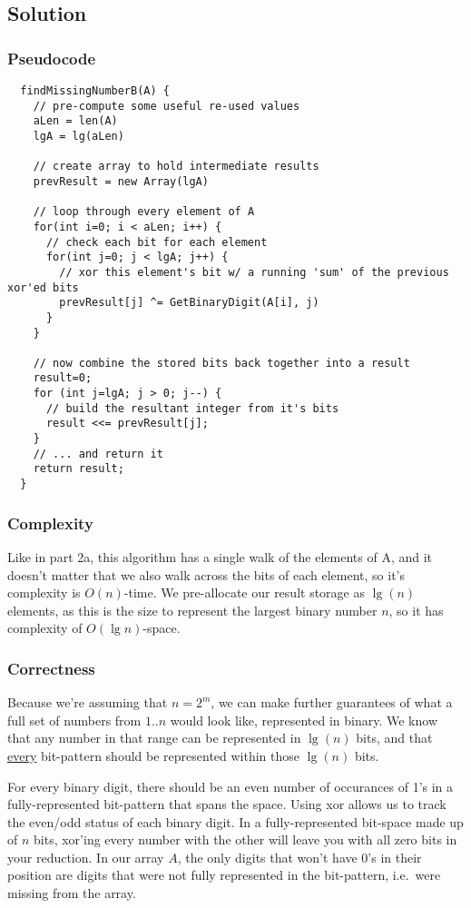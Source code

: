 \subsection*{Solution}
\subsubsection*{Pseudocode}
\begin{verbatim}
  findMissingNumberB(A) {
    // pre-compute some useful re-used values
    aLen = len(A)
    lgA = lg(aLen)

    // create array to hold intermediate results
    prevResult = new Array(lgA)

    // loop through every element of A
    for(int i=0; i < aLen; i++) {
      // check each bit for each element
      for(int j=0; j < lgA; j++) {
        // xor this element's bit w/ a running 'sum' of the previous xor'ed bits
        prevResult[j] ^= GetBinaryDigit(A[i], j)
      }
    }

    // now combine the stored bits back together into a result
    result=0;
    for (int j=lgA; j > 0; j--) {
      // build the resultant integer from it's bits
      result <<= prevResult[j];
    }
    // ... and return it
    return result;
  }
\end{verbatim}

\subsubsection*{Complexity}
Like in part 2a, this algorithm has a single walk of the elements of A, and it doesn't matter that we also walk across the bits of each element, so it's complexity is $O(n)$-time. We pre-allocate our result storage as $\lg(n) $elements, as this is the size to represent the largest binary number $n$, so it has complexity of $O(\lg n)$-space.

\subsubsection*{Correctness}
Because we're assuming that $n=2^{m}$, we can make further guarantees of what a full set of numbers from $1..n$ would look like, represented in binary. We know that any number in that range can be represented in $\lg(n)$ bits, and that \underline{every} bit-pattern should be represented within those $\lg(n)$ bits.

For every binary digit, there should be an even number of occurances of 1's in a fully-represented bit-pattern that spans the space. Using xor allows us to track the even/odd status of each binary digit. In a fully-represented bit-space made up of $n$ bits, xor'ing every number with the other will leave you with all zero bits in your reduction. In our array $A$, the only digits that won't have 0's in their position are digits that were not fully represented in the bit-pattern, i.e.\ were missing from the array.

